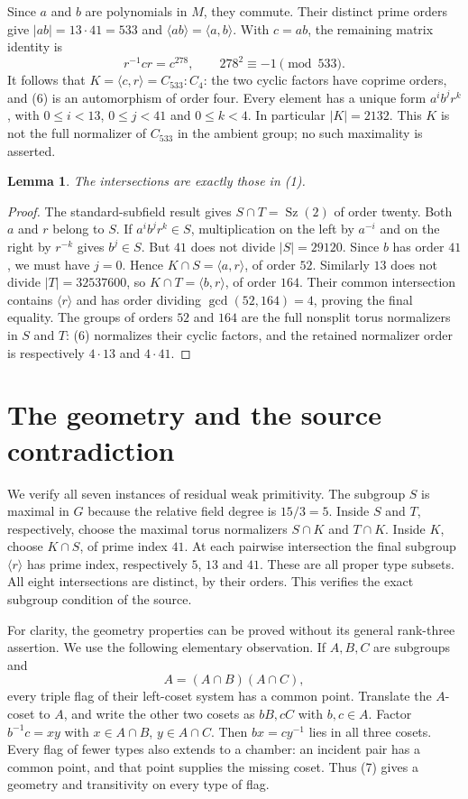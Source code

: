 \documentclass[11pt,a4paper]{article}
\newtheorem{lemma}[theorem]{Lemma}
\newcommand{\Sz}{\operatorname{Sz}}
\newcommand{\gen}[1]{\langle #1\rangle}
\begin{document}
Since $a$ and $b$ are polynomials in $M$, they commute. Their distinct
prime orders give $|ab|=13\cdot41=533$ and
$\gen{ab}=\gen{a,b}$. With $c=ab$, the remaining matrix identity is
\[
                     r^{-1}cr=c^{278},\qquad
                     278^2\equiv-1\pmod{533}.            \tag{6}
\]
It follows that $K=\gen{c,r}=C_{533}:C_4$: the two cyclic factors
have coprime orders, and (6) is an automorphism of order four.
Every element has a unique form $a^i b^j r^k$, with
$0\le i<13$, $0\le j<41$ and $0\le k<4$.
In particular $|K|=2132$. This $K$ is not the full normalizer of
$C_{533}$ in the ambient group; no such maximality is asserted.

\begin{lemma}\label{meets}
The intersections are exactly those in (1).
\end{lemma}
\begin{proof}
The standard-subfield result gives $S\cap T=\Sz(2)$ of order twenty.
Both $a$ and $r$ belong to $S$. If $a^i b^j r^k\in S$, multiplication
on the left by $a^{-i}$ and on the right by $r^{-k}$ gives $b^j\in S$.
But $41$ does not divide $|S|=29120$. Since $b$ has order $41$,
we must have $j=0$. Hence $K\cap S=\gen{a,r}$, of order $52$.
Similarly $13$ does not divide $|T|=32537600$, so
$K\cap T=\gen{b,r}$, of order $164$.
Their common intersection contains $\gen{r}$ and has order dividing
$\gcd(52,164)=4$, proving the final equality.
The groups of orders $52$ and $164$ are the full nonsplit torus
normalizers in $S$ and $T$: (6) normalizes their cyclic factors, and
the retained normalizer order is respectively $4\cdot13$ and
$4\cdot41$.
\end{proof}

\section{The geometry and the source contradiction}
We verify all seven instances of residual weak primitivity. The
subgroup $S$ is maximal in $G$ because the relative field degree is
$15/3=5$. Inside $S$ and $T$, respectively, choose the maximal torus
normalizers $S\cap K$ and $T\cap K$. Inside $K$, choose $K\cap S$,
of prime index $41$. At each pairwise intersection the final subgroup
$\gen{r}$ has prime index, respectively $5$, $13$ and $41$.
These are all proper type subsets. All eight intersections are distinct,
by their orders. This verifies the exact subgroup condition of the source.

For clarity, the geometry properties can be proved without its general
rank-three assertion. We use the following elementary observation.
If $A,B,C$ are subgroups and
\[
                         A=(A\cap B)(A\cap C),           \tag{7}
\]
every triple flag of their left-coset system has a common point.
Translate the $A$-coset to $A$, and write the other two cosets as
$bB,cC$ with $b,c\in A$. Factor $b^{-1}c=xy$ with
$x\in A\cap B$, $y\in A\cap C$. Then $bx=cy^{-1}$ lies in
all three cosets. Every flag of fewer types also extends to a chamber:
an incident pair has a common point, and that point supplies the missing
coset. Thus (7) gives a geometry and transitivity on every type of flag.
\end{document}
